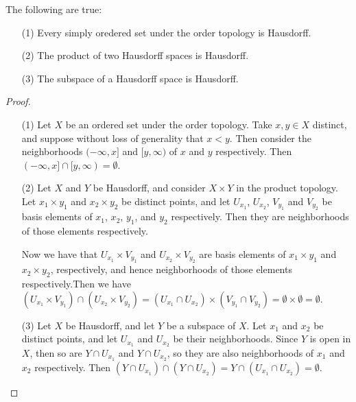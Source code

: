 \begin{theorem}\label{1.6.12}
    The following are true:
        \begin{enumerate}
            \item[(1)] Every simply oredered set under the order topology is
                Hausdorff.

            \item[(2)] The product of two Hausdorff spaces is Hausdorff.

            \item[(3)] The subspace of a Hausdorff space is Hausdorff.
        \end{enumerate}
\end{theorem}
\begin{proof}
    \begin{enumerate}
        \item[(1)] Let $X$ be an ordered set under the order topology. Take  $x,y \in
            X$ distinct, and suppose without loss of generality that $x<y$. Then
            consider the neighborhoods  $(-\infty,x]$ and  $[y,\infty)$ of  $x$
            and  $y$ respectively. Then  $(-\infty,x] \cap
            [y,\infty)=\emptyset$.

        \item[(2)] Let $X$ and  $Y$ be Hausdorff, and consider  $X \times Y$ in the
            product topology. Let  $ x_1 \times y_1$ and $ x_2 \times y_2$ be
            distinct points, and let $U_{x_1}$, $U_{x_2}$, $V_{y_1}$ and
            $V_{y_2}$ be basis elements of $ x_1$, $ x_2$, $y_1$, and $y_2$
            respectively. Then they are neighborhoods of those elements
            respectively.

            Now we have that $U_{x_1} \times V_{y_1}$ and $U_{x_2} \times
            V_{y_2}$ are basis elements of $ x_1 \times y_1$ and $ x_2 \times
            y_2$, respectively, and hence neighborhoods of those elements
            respectively.Then we have $(U_{x_1} \times V_{y_1}) \cap (U_{x_2} \times
            V_{y_2})=(U_{x_1} \cap U_{x_2}) \times (V_{y_1} \cap V_{y_2}) = \emptyset
            \times \emptyset =\emptyset$.

        \item[(3)] Let $X$ be Hausdorff, and let  $Y$ be a subspace of  $X$. Let  $x_1$
            and $x_2$ be distinct points, and let  $U_{x_1}$ and $U_{x_2}$ be
            their neighborhoods. Since $Y$ is open in  $X$, then so are  $Y \cap
            U_{x_1}$ and $Y \cap U_{x_2}$, so they are also neighborhoods of $
            x_1$ and $ x_2$ respectively. Then $(Y \cap U_{x_1}) \cap
            (Y \cap U_{x_2})=Y \cap (U_{x_1} \cap
            U_{x_2})=\emptyset$.
    \end{enumerate}
\end{proof}

